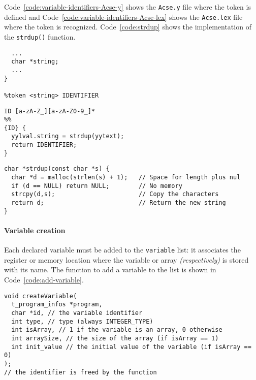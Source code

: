 \documentclass[english]{article}
\begin{document}
Code~\ref{code:variable-identifiers-Acse-y} shows the \texttt{Acse.y} file where the token is defined and Code~\ref{code:variable-identifiers-Acse-lex} shows the \texttt{Acse.lex} file where the token is recognized.
Code~\ref{code:strdup} shows the implementation of the \clang \texttt{strdup()} function.

\begin{onepage}
  \begin{lstlisting}[language=LANCE, caption={Content of \texttt{Acse.y} file}, label={code:variable-identifiers-Acse-y}]
%union {
  ...
  char *string;
  ...
}

%token <string> IDENTIFIER
\end{lstlisting}
\end{onepage}

\begin{onepage}
  \begin{lstlisting}[language=LANCE, caption={Content of \texttt{Acse.lex} file}, label={code:variable-identifiers-Acse-lex}]
ID [a-zA-Z_][a-zA-Z0-9_]*
%%
{ID} {
  yylval.string = strdup(yytext);
  return IDENTIFIER;
}
\end{lstlisting}
\end{onepage}

\begin{onepage}
  \begin{lstlisting}[language=LANCE, caption={\texttt{stdrup()} function}, label={code:strdup}]
char *strdup(const char *s) {
  char *d = malloc(strlen(s) + 1);   // Space for length plus nul
  if (d == NULL) return NULL;        // No memory
  strcpy(d,s);                       // Copy the characters
  return d;                          // Return the new string
}
\end{lstlisting}
\end{onepage}

\paragraph{Variable creation}

Each declared variable must be added to the \texttt{variable} list: it associates the register or memory location where the variable or array \textit{(respectively)} is stored with its name.
The function to add a variable to the list is shown in Code~\ref{code:add-variable}.

\begin{onepage}
  \begin{lstlisting}[language=LANCE, caption={Add variable to the list}, label={code:add-variable}]
void createVariable(
  t_program_infos *program,
  char *id, // the variable identifier
  int type, // type (always INTEGER_TYPE)
  int isArray, // 1 if the variable is an array, 0 otherwise
  int arraySize, // the size of the array (if isArray == 1)
  int init_value // the initial value of the variable (if isArray == 0)
);
// the identifier is freed by the function
\end{lstlisting}
\end{onepage}
\end{document}
